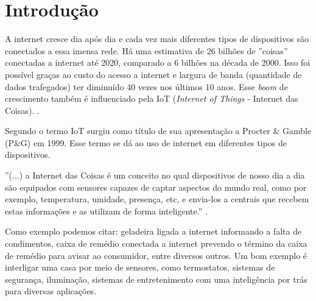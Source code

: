 \documentclass[
		12pt,				%
		openright,			%
		oneside,			%
		a4paper,			%
		chapter=TITLE,		%
		english,			%
		brazil				%
	]{abntex2}
\begin{document}



\textual


\chapter{Introdução}\label{cap:introducao}

A internet cresce dia após dia e cada vez mais diferentes tipos de dispositivos são conectados a essa imensa rede. Há uma estimativa de 26 bilhões de ''coisas'' conectadas a internet até 2020, comparado a 6 bilhões na década de 2000. Isso foi possível graças ao custo do acesso a internet e largura de banda (quantidade de dados trafegados) ter diminuído 40 vezes nos últimos 10 anos. Esse \textit{boom} de crescimento também é influenciado pela IoT (\textit{Internet of Things} - Internet das Coisas). \cite{goldmansachs-iot}. 

Segundo  o termo IoT surgiu como título de sua apresentação a Procter \& Gamble (P\&G) em 1999. Esse termo se dá ao uso de internet em diferentes tipos de dispositivos. 

\begin{citacao}
''(...) a Internet das Coisas é um conceito no qual dispositivos de nosso dia a dia são equipados com sensores capazes de captar aspectos do mundo real, como por exemplo, temperatura, umidade, presença, etc, e envia-los a centrais que recebem estas informações e as utilizam de forma inteligente.'' \cite{nascimento-iot}.
\end{citacao}

Como exemplo podemos citar: geladeira ligada a internet informando a falta de condimentos, caixa de remédio conectada a internet prevendo o término da caixa de remédio para avisar ao consumidor, entre diversos outros. Um bom exemplo é interligar uma casa por meio de sensores, como termostatos, sistemas de segurança, iluminação, sistemas de entretenimento com uma inteligência por trás para diversas aplicações. \cite{goldmansachs-iot}
\end{document}
